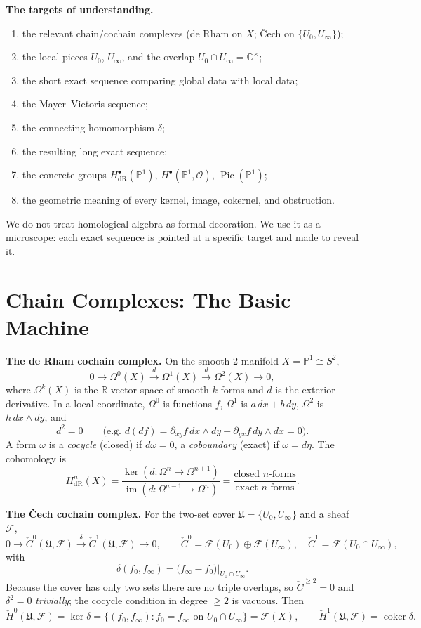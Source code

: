 \documentclass[11pt]{article}
\newcommand{\CC}{\mathbb C}
\newcommand{\RR}{\mathbb R}
\newcommand{\PP}{\mathbb P}
\newcommand{\OO}{\mathcal O}
\newcommand{\FF}{\mathcal F}
\newcommand{\CCech}{\check C}
\newcommand{\Hcech}{\check H}
\newcommand{\dR}{\mathrm{dR}}
\newcommand{\im}{\operatorname{im}}
\newcommand{\coker}{\operatorname{coker}}
\newcommand{\kerop}{\operatorname{ker}}
\newcommand{\Pic}{\operatorname{Pic}}
\theoremstyle{plain}
\theoremstyle{definition}
\begin{document}
\medskip\noindent\textbf{The targets of understanding.}
\begin{enumerate}
  \item the relevant chain/cochain complexes (de Rham on $X$; \v Cech on
        $\{U_0,U_\infty\}$);
  \item the local pieces $U_0$, $U_\infty$, and the overlap $U_0\cap U_\infty=\CC^\times$;
  \item the short exact sequence comparing global data with local data;
  \item the Mayer--Vietoris sequence;
  \item the connecting homomorphism $\delta$;
  \item the resulting long exact sequence;
  \item the concrete groups $H^\bullet_\dR(\PP^1)$, $H^\bullet(\PP^1,\OO)$,
        $\Pic(\PP^1)$;
  \item the geometric meaning of every kernel, image, cokernel, and obstruction.
\end{enumerate}
We do not treat homological algebra as formal decoration. We use it as a
microscope: each exact sequence is pointed at a specific target and made to
reveal it.

\section{Chain Complexes: The Basic Machine}
\noindent\textbf{The de Rham cochain complex.} On the smooth $2$-manifold
$X=\PP^1\cong S^2$,
\[
  0\longrightarrow \Omega^0(X)\xrightarrow{\,d\,}\Omega^1(X)
  \xrightarrow{\,d\,}\Omega^2(X)\longrightarrow 0,
\]
where $\Omega^k(X)$ is the $\RR$-vector space of smooth $k$-forms and $d$ is the
exterior derivative. In a local coordinate, $\Omega^0$ is functions $f$,
$\Omega^1$ is $a\,dx+b\,dy$, $\Omega^2$ is $h\,dx\wedge dy$, and
\[
  d^2=0
  \qquad\bigl(\text{e.g. } d(df)=\partial_{xy}f\,dx\wedge dy-\partial_{yx}f\,dy\wedge dx=0\bigr).
\]
A form $\omega$ is a \emph{cocycle} (closed) if $d\omega=0$, a \emph{coboundary}
(exact) if $\omega=d\eta$. The cohomology is
\[
  H^n_\dR(X)=\frac{\kerop(d:\Omega^n\to\Omega^{n+1})}
                  {\im(d:\Omega^{n-1}\to\Omega^{n})}
  =\frac{\text{closed }n\text{-forms}}{\text{exact }n\text{-forms}} .
\]

\medskip\noindent\textbf{The \v Cech cochain complex.} For the two-set cover
$\mathfrak U=\{U_0,U_\infty\}$ and a sheaf $\FF$,
\[
  0\longrightarrow \CCech^0(\mathfrak U,\FF)\xrightarrow{\,\delta\,}
  \CCech^1(\mathfrak U,\FF)\longrightarrow 0,\qquad
  \CCech^0=\FF(U_0)\oplus\FF(U_\infty),\quad
  \CCech^1=\FF(U_0\cap U_\infty),
\]
with
\[
  \delta(f_0,f_\infty)=\bigl(f_\infty-f_0\bigr)\big|_{U_0\cap U_\infty}.
\]
Because the cover has only two sets there are no triple overlaps, so
$\CCech^{\ge2}=0$ and $\delta^2=0$ \emph{trivially}; the cocycle condition in
degree $\ge2$ is vacuous. Then
\[
  \Hcech^0(\mathfrak U,\FF)=\kerop\delta=\{(f_0,f_\infty):f_0=f_\infty\text{ on }U_0\cap U_\infty\}=\FF(X),
  \qquad
  \Hcech^1(\mathfrak U,\FF)=\coker\delta .
\]
\end{document}
